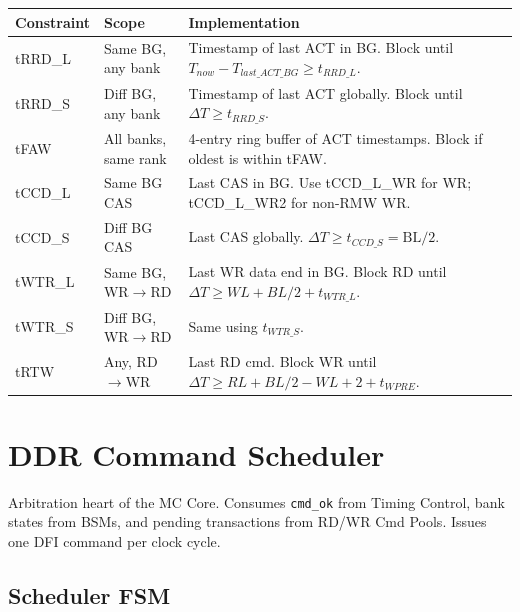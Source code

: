\documentclass[10pt,a4paper]{article}
\newcommand{\Th}[1]{\cellcolor{thbg}\textbf{\small\color{acc1}#1}}
\newcommand{\RA}{\rowcolor{white}}
\newcommand{\RB}{\rowcolor{altbg}}
\begin{document}
\begin{center}
\begin{tabularx}{\linewidth}{@{} l l X @{}}
\toprule
\Th{Constraint} & \Th{Scope} & \Th{Implementation} \\
\midrule
\RA tRRD\_L & Same BG, any bank & Timestamp of last ACT in BG. Block until $T_{now}-T_{last\_ACT\_BG}\geq t_{RRD\_L}$. \\
\RB tRRD\_S & Diff BG, any bank & Timestamp of last ACT globally. Block until $\Delta T\geq t_{RRD\_S}$. \\
\RA tFAW    & All banks, same rank & 4-entry ring buffer of ACT timestamps. Block if oldest is within tFAW. \\
\RB tCCD\_L & Same BG CAS & Last CAS in BG. Use tCCD\_L\_WR for WR; tCCD\_L\_WR2 for non-RMW WR. \\
\RA tCCD\_S & Diff BG CAS & Last CAS globally. $\Delta T\geq t_{CCD\_S}=\text{BL}/2$. \\
\RB tWTR\_L & Same BG, WR$\to$RD & Last WR data end in BG. Block RD until $\Delta T\geq WL+BL/2+t_{WTR\_L}$. \\
\RA tWTR\_S & Diff BG, WR$\to$RD & Same using $t_{WTR\_S}$. \\
\RB tRTW    & Any, RD$\to$WR     & Last RD cmd. Block WR until $\Delta T\geq RL+BL/2-WL+2+t_{WPRE}$. \\
\bottomrule
\end{tabularx}
\end{center}

\section{DDR Command Scheduler}

Arbitration heart of the MC Core. Consumes \texttt{cmd\_ok} from Timing Control,
bank states from BSMs, and pending transactions from RD/WR Cmd Pools.
Issues one DFI command per clock cycle.

\subsection{Scheduler FSM}
\end{document}
